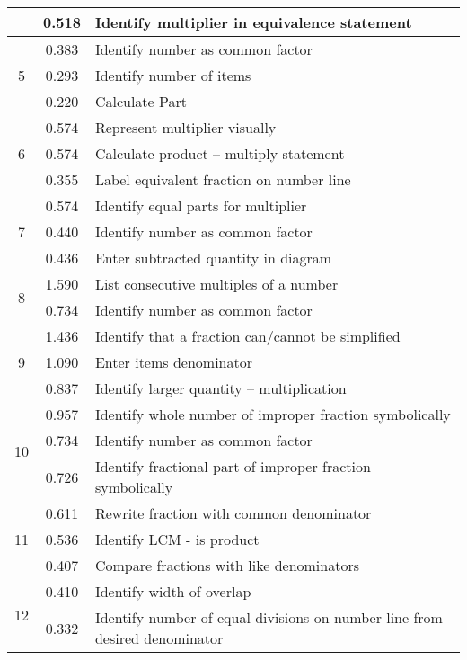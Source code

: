 \begin{longtable}[c]{|c|c|l|}
 & \small 0.518 & \small Identify multiplier in equivalence statement \\
\hline
\multirow{3}{*}{\small 5} & \small 0.383 & \small Identify number as common factor \\
 & \small 0.293 & \small Identify number of items \\
 & \small 0.220 & \small Calculate Part \\
\hline
\multirow{3}{*}{\small 6} & \small 0.574 & \small Represent multiplier visually \\
 & \small 0.574 & \small Calculate product -- multiply statement \\
 & \small 0.355 & \small Label equivalent fraction on number line \\
\hline
\multirow{3}{*}{\small 7} & \small 0.574 & \small Identify equal parts for multiplier \\
 & \small 0.440 & \small Identify number as common factor \\
 & \small 0.436 & \small Enter subtracted quantity in diagram \\
\hline
\multirow{2}{*}{\small 8} & \small 1.590 & \small List consecutive multiples of a number \\
 & \small 0.734 & \small Identify number as common factor \\
\hline
\multirow{3}{*}{\small 9} & \small 1.436 & \small Identify that a fraction can/cannot be simplified \\
 & \small 1.090 & \small Enter items denominator \\
 & \small 0.837 & \small Identify larger quantity -- multiplication \\
\hline
\multirow{3}{*}{\small 10} & \small 0.957 & \small Identify whole number of improper fraction symbolically \\
 & \small 0.734 & \small Identify number as common factor \\
 & \small 0.726 & \small Identify fractional part of improper fraction symbolically \\
\hline
\multirow{3}{*}{\small 11} & \small 0.611 & \small Rewrite fraction with common denominator \\
 & \small 0.536 & \small Identify LCM - is product \\
 & \small 0.407 & \small Compare fractions with like denominators \\
\hline
\multirow{3}{*}{\small 12} & \small 0.410 & \small Identify width of overlap \\
 & \small 0.332 & \small Identify number of equal divisions on number line from desired denominator \\

\end{longtable}
